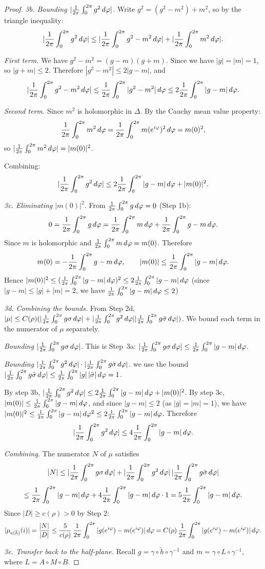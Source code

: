 \begin{proof}
	\medskip
	\noindent\textit{3b. Bounding $|\avg{g^2}|$.}
	Write $g^2 = (g^2 - m^2) + m^2$, so by the triangle inequality:
	\[
	|\avg{g^2}| \leq |\avg{g^2 - m^2}| + |\avg{m^2}|.
	\]
	
	\textit{First term.} We have $g^2 - m^2 = (g - m)(g + m)$. Since we have $|g| = |m| = 1$, so $|g + m| \leq 2$. Therefore $|g^2 - m^2| \leq 2|g - m|$, and
	\[
	|\avg{g^2 - m^2}| \leq \avg{|g^2 - m^2|} \leq 2\avg{|g - m|}.
	\]
	
	\textit{Second term.} Since $m^2$ is holomorphic in $\Delta$. By the Cauchy mean value property:
	\[
	\avg{m^2} = \frac{1}{2\pi}\int_0^{2\pi} m(e^{i\varphi})^2\,d\varphi = m(0)^2,
	\]
	so $|\avg{m^2}| = |m(0)|^2$.
	
	Combining:
	\[
	|\avg{g^2}| \leq 2\avg{|g - m|} + |m(0)|^2.
	\]
	
	\medskip
	\noindent\textit{3c. Eliminating $|m(0)|^2$.}
	From $\avg{g} = 0$ (Step 1b):
	\[
	0 = \avg{g} = \avg{m} + \avg{g - m}.
	\]
	Since $m$ is holomorphic and $\avg{m} = m(0)$. Therefore
	\[
	m(0) = -\avg{g - m}, \qquad |m(0)| \leq \avg{|g - m|}.
	\]
	Hence $|m(0)|^2 \leq (\avg{|g - m|})^2 \leq 2\avg{|g - m|}$ (since $|g - m| \leq |g| + |m| = 2$, we have $\avg{|g-m|} \leq 2$)
	
	\medskip
	\noindent\textit{3d. Combining the bounds.}
	From Step 2d, $|\mu| \leq C(\rho)(|\avg{g\sigma}| + |\avg{g^2}||\avg{g\bar{\sigma}}|)$. We bound each term in the numerator of $\mu$ separately.
	
	\textit{Bounding $|\avg{g\sigma}|$.} This is Step~3a: $|\avg{g\sigma}|\le\avg{|g-m|}$.
	
	\textit{Bounding $|\avg{g^2}| \cdot |\avg{g\bar{\sigma}}|$.} we use the  bound $|\avg{g\bar{\sigma}}| \leq \avg{|g|\,|\bar{\sigma}|} = 1$.
	
	By step 3b, $|\avg{g^2}| \leq 2\avg{|g - m|} + |m(0)|^2$. By step 3c, $|m(0)| \leq \avg{|g - m|}$, and since $|g - m| \leq 2$ (as $|g| = |m| = 1$), we have $|m(0)|^2 \leq \avg{|g-m|}^2 \leq 2\avg{|g-m|}$. Therefore
	\[
	|\avg{g^2}| \leq 4\avg{|g - m|}.
	\]
	
	\textit{Combining.} The numerator $N$ of $\mu$ satisfies
	\[
	|N| \leq |\avg{g\sigma}| + |\avg{g^2}|\,|\avg{g\bar{\sigma}}|\] \[ \leq \avg{|g - m|} + 4\avg{|g - m|} \cdot 1 = 5\avg{|g - m|}.
	\]
	Since $|D| \geq c(\rho) > 0$ by Step 2:
	\[
	|\mu_{e(\tilde{h})}(i)| = \frac{|N|}{|D|} \leq \frac{5}{c(\rho)}\,\avg{|g(e^{i\varphi}) - m(e^{i\varphi})|} = C(\rho)\,\avg{|g(e^{i\varphi}) - m(e^{i\varphi})|}.
	\]
	
	\medskip
	\noindent\textit{3e. Transfer back to the half-plane.}
	Recall $g = \gamma \circ \tilde{h} \circ \gamma^{-1}$ and $m = \gamma \circ L \circ \gamma^{-1}$, where $L = A \circ M \circ B$.
	

\end{proof}

